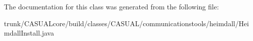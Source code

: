 The documentation for this class was generated from the following file\-:\begin{DoxyCompactItemize}
\item 
trunk/\-C\-A\-S\-U\-A\-Lcore/build/classes/\-C\-A\-S\-U\-A\-L/communicationstools/heimdall/Heimdall\-Install.\-java\end{DoxyCompactItemize}

